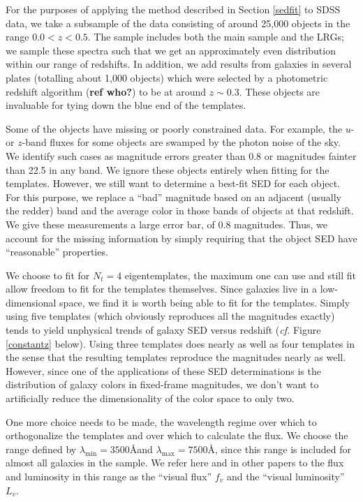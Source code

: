 \documentclass[10pt,preprint]{aastex}
\begin{document}
For the purposes of applying the method described in Section
\ref{sedfit} to SDSS data, we take a subsample of the data consisting
of around 25,000 objects in the range $0.0<z<0.5$. The sample includes
both the main sample and the LRGs; we sample these spectra such that
we get an approximately even distribution within our range of
redshifts. In addition, we add results from galaxies in several plates
(totalling about 1,000 objects) which were selected by a photometric
redshift algorithm ({\bf ref who?}) to be at around $z\sim 0.3$. These
objects are invaluable for tying down the blue end of the templates.

Some of the objects have missing or poorly constrained data. For
example, the $u$- or $z$-band fluxes for some objects are swamped by
the photon noise of the sky. We identify such cases as magnitude
errors greater than 0.8 or magnitudes fainter than 22.5 in any
band. We ignore these objects entirely when fitting for the
templates. However, we still want to determine a best-fit SED for each
object. For this purpose, we replace a ``bad'' magnitude based on an
adjacent (usually the redder) band and the average color in those
bands of objects at that redshift. We give these measurements a large
error bar, of 0.8 magnitudes. Thus, we account for the missing
information by simply requiring that the object SED have
``reasonable'' properties.

We choose to fit for $N_t = 4$ eigentemplates, the maximum one can use
and still fit allow freedom to fit for the templates themselves. Since
galaxies live in a low-dimensional space, we find it is worth being
able to fit for the templates. Simply using five templates (which
obviously reproduces all the magnitudes exactly) tends to yield
unphysical trends of galaxy SED versus redshift ({\it cf.}  Figure
\ref{constantz} below). Using three templates does nearly as well as
four templates in the sense that the resulting templates reproduce the
magnitudes nearly as well. However, since one of the applications of
these SED determinations is the distribution of galaxy colors in
fixed-frame magnitudes, we don't want to artificially reduce the
dimensionality of the color space to only two.

One more choice needs to be made, the wavelength regime over which to
orthogonalize the templates and over which to calculate the flux. We
choose the range defined by $\lambda_{\mathrm{min}}=3500$\AA and
$\lambda_{\mathrm{max}}=7500$\AA, since this range is included for
almost all galaxies in the sample. We refer here and in other papers
to the flux and luminosity in this range as the ``visual flux'' $f_v$
and the ``visual luminosity'' $L_v$.
\end{document}
